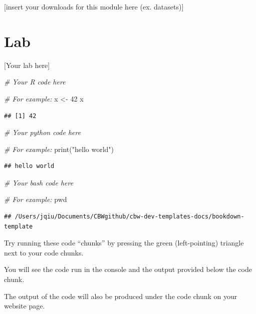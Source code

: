 \documentclass[
]{book}
\newenvironment{Shaded}{\begin{snugshade}}{\end{snugshade}}
\newcommand{\BuiltInTok}[1]{#1}
\newcommand{\CommentTok}[1]{\textcolor[rgb]{0.56,0.35,0.01}{\textit{#1}}}
\newcommand{\DecValTok}[1]{\textcolor[rgb]{0.00,0.00,0.81}{#1}}
\newcommand{\NormalTok}[1]{#1}
\newcommand{\OtherTok}[1]{\textcolor[rgb]{0.56,0.35,0.01}{#1}}
\newcommand{\StringTok}[1]{\textcolor[rgb]{0.31,0.60,0.02}{#1}}
\begin{document}
{[}insert your downloads for this module here (ex. datasets){]}

\section{Lab}\label{lab}

{[}Your lab here{]}

\begin{Shaded}
\begin{Highlighting}[]
\CommentTok{\# Your R code here}

\CommentTok{\# For example:}
\NormalTok{x }\OtherTok{\textless{}{-}} \DecValTok{42}
\NormalTok{x}
\end{Highlighting}
\end{Shaded}

\begin{verbatim}
## [1] 42
\end{verbatim}

\begin{Shaded}
\begin{Highlighting}[]
\CommentTok{\# Your python code here}

\CommentTok{\# For example:}
\BuiltInTok{print}\NormalTok{(}\StringTok{"hello world"}\NormalTok{)}
\end{Highlighting}
\end{Shaded}

\begin{verbatim}
## hello world
\end{verbatim}

\begin{Shaded}
\begin{Highlighting}[]
\CommentTok{\# Your bash code here}

\CommentTok{\# For example:}
\BuiltInTok{pwd}
\end{Highlighting}
\end{Shaded}

\begin{verbatim}
## /Users/jqiu/Documents/CBWgithub/cbw-dev-templates-docs/bookdown-template
\end{verbatim}

Try running these code ``chunks'' by pressing the green (left-pointing) triangle next to your code chunks.

You will see the code run in the console and the output provided below the code chunk.

The output of the code will also be produced under the code chunk on your website page.
\end{document}
